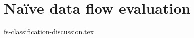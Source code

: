 \documentclass[sigconf]{acmart}
\theoremstyle{remark}
\begin{document}


\section {Na\"ive data flow evaluation}
 {fs-classification-discussion.tex}






\end{document}
